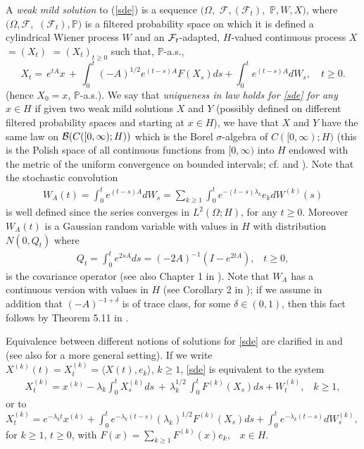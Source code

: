 \documentclass[preprint]{imsart}
\def\P{\mathbb P}
\def\ds{\displaystyle}
\begin{document}
 \vskip 1mm 
  A  { \sl  weak mild solution}  to 
(\ref{sde})    is a sequence $( 
\Omega,$ $ {\mathcal F},
 ({\mathcal F}_{t}),$ $ \P, W, X ) $, where $(
\Omega, {\mathcal F},$ $
 ({\mathcal F}_{t}), \P )$ is a  filtered probability space  
  on which it is defined a
cylindrical Wiener process $W$ and
 an ${\cal F}_t$-adapted,   $H$-valued
continuous process $X$ $ = (X_t)$ $ = (X_t)_{t \ge 0}$ such that, $\P$-a.s., 
 \begin{equation}
  \label{mqq}
X_{t}= \,  e^{tA}x \, + \, \int_{0}^{t}(-A)^{1/2}e^{(  t-s)  A}F  (
X_{s})
ds
+\int_{0}^{t}e^{(  t-s)  A}dW_{s},\quad  t \ge 0.
\end{equation}
(hence  $X_0 =x$, $\P$-a.s.). 
 We say that  {\sl uniqueness in law holds for \eqref{sde} for any $x \in H$ } if  given two weak mild solutions   $X$ and $Y$     (possibly defined on different filtered probability spaces and starting at $x \in H$), we have that  $X$ and $Y$ have the same law on ${\cal B}(C([0, \infty); H))$ which is the Borel $\sigma$-algebra of $C([0, \infty); H)$  (this is the  Polish    space of  all continuous functions  from $[0, \infty)$ into $H$ endowed with the metric of the uniform convergence on bounded intervals; cf. \cite{KS} and  \cite{DZ}).
  Note that   the stochastic convolution
$$    
  \begin{array} {l}
W_A(t) =\int_{0}^{t}e^{\left(  t-s\right)  A}dW_{s} = \sum_{k \ge 1}
\int_0^t e^{-(t-s) \lambda_k}e_k dW^{(k)}(s)
\end{array} 
$$
is well defined since 
 the series converges in $L^2(\Omega; H)$, for any $t \ge 0$. Moreover $W_A(t)$ is a Gaussian random variable with values in $H$ with distribution $N(0,Q_t)$
 where 
 \begin{equation}\label{qt1}
 \begin{array} {l}
Q_t = \int_0^t e^{2 sA} ds =  (-2 A)^{-1}(I-e^{2tA}),\;\;\; t \ge 0,
\end{array}
\end{equation}
 is   the covariance operator
(see also Chapter 1 in \cite{DZ1}).   
Note that $ W_A $ has a continuous version with values in $H$ (see Corollary 2 in  \cite{Tala});   if we assume in addition that $(-A)^{-1 + \delta}$ is of trace class, for some $\delta \in
(0,1)$, then  this fact follows by Theorem 5.11 in \cite{DZ}.   
  

Equivalence between {   different} notions of solutions for \eqref{sde}  
  are clarified  in \cite{DZ1} and \cite{hairer} (see also  \cite{kunze} for a more general setting).    If we write  $ X^{(k)}(t)=  X^{(k)}_t = \langle  X(t), e_k \rangle $, $k \ge 1$, \eqref{sde} is equivalent to the system 
\begin{gather} \label{d33}
   X^{(k)}_t =  x^{(k)} -    \lambda_{k} \int_0^t   X^{(k)}_s ds 
  \, + \, \lambda_{k}^{1/2} \, \int_0^t F^{(k)}( X_s )ds + W_{t}^{(k)},\;\;\; k \ge 1,
\end{gather}     
or to 
 $ \ds  
X^{(k)}_t =  e^{- \lambda_k t}  x^{(k)}    +
  \int_0^t e^{-\lambda_k (t-s)}(\lambda_k)^{1/2}F^{(k)}(X_s)  ds +  \int_0^t e^{-\lambda_k (t-s)} d W^{(k)}_s,
$ 
for $k \ge 1$, $t \ge 0$, with 
$
F(x) = \sum_{k \ge 1}   F^{(k)}(x)e_k, \;\;\; x \in H.   
$
\end{document}
